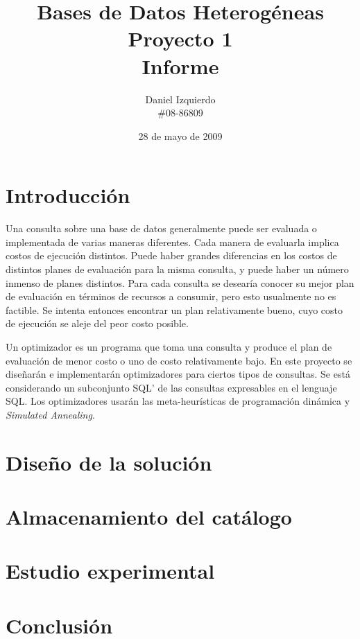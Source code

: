 \documentclass[12pt]{article}
\begin{document}

\title{Bases de Datos Heterogéneas \\ Proyecto 1 \\ Informe}
\author{Daniel Izquierdo \\ \#08-86809}
\date{28 de mayo de 2009}

\maketitle

\section{Introducción}

Una consulta sobre una base de datos generalmente puede ser evaluada o
implementada de varias maneras diferentes. Cada manera de evaluarla implica
costos de ejecución distintos. Puede haber grandes diferencias en los costos de
distintos planes de evaluación para la misma consulta, y puede haber un número
inmenso de planes distintos. Para cada consulta se desearía conocer su mejor
plan de evaluación en términos de recursos a consumir, pero esto usualmente no
es factible. Se intenta entonces encontrar un plan relativamente bueno, cuyo
costo de ejecución se aleje del peor costo posible.

Un optimizador es un programa que toma una consulta y produce el plan de
evaluación de menor costo o uno de costo relativamente bajo.
En este proyecto se diseñarán e implementarán optimizadores para ciertos tipos
de consultas. Se está considerando un subconjunto SQL' de las consultas
expresables en el lenguaje SQL. Los optimizadores usarán las meta-heurísticas de
programación dinámica y \emph{Simulated Annealing}.

\section{Diseño de la solución}

\section{Almacenamiento del catálogo}

\section{Estudio experimental}

\section{Conclusión}
\end{document}
